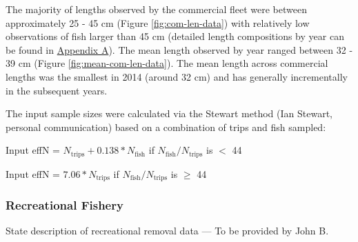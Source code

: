 \documentclass[11pt,
  english,
  a4paper,
]{article}
\begin{document}
\leavevmode\tagmcend\tagstructend\par


The majority of lengths observed by the commercial fleet were between approximately 25 - 45 cm (Figure \ref{fig:com-len-data}) with relatively low observations of fish larger than 45 cm (detailed length compositions by year can be found in {\protect\hyperlink{append_a}{Appendix A}\leavevmode\tagmcend\tagstructend}). The mean length observed by year ranged between 32 - 39 cm (Figure \ref{fig:mean-com-len-data}). The mean length across commercial lengths was the smallest in 2014 (around 32 cm) and has generally incrementally in the subsequent years.

\leavevmode\tagmcend\tagstructend\par


The input sample sizes were calculated via the Stewart method (Ian Stewart, personal communication) based on a combination of trips and fish sampled:

\leavevmode\tagmcend\tagstructend\par

\begin{centering}

Input effN = $N_{\text{trips}} + 0.138 * N_{\text{fish}}$ if $N_{\text{fish}}/N_{\text{trips}}$ is $<$ 44

Input effN = $7.06 * N_{\text{trips}}$ if $N_{\text{fish}}/N_{\text{trips}}$ is $\geq$ 44

\end{centering}


\hypertarget{recreational-fishery}{%
\subsubsection{Recreational Fishery}\label{recreational-fishery}}

\leavevmode\tagmcend\tagstructend


State description of recreational removal data --- To be provided by John B.

\leavevmode\tagmcend\tagstructend\par
\end{document}
